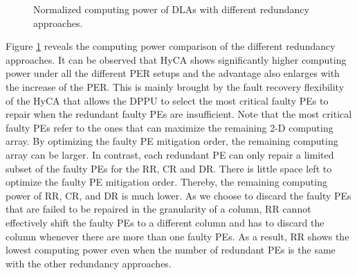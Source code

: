 \begin{figure}
\setlength{\abovecaptionskip}{-10pt}
\setlength{\belowcaptionskip}{-2pt}
    \caption{Normalized computing power of DLAs with different redundancy approaches.}
\label{fig:available}
\vspace{-1em}
\end{figure}

Figure \ref{fig:available} reveals the computing power comparison of the different redundancy approaches. It can be observed that HyCA shows significantly higher computing power under all the different PER setups and the advantage also enlarges with the increase of the PER. This is mainly brought by the fault recovery flexibility of the HyCA that allows the DPPU to select the most critical faulty PEs to repair when the redundant faulty PEs are insufficient. Note that the most critical faulty PEs refer to the ones that can maximize the remaining 2-D computing array. By optimizing the faulty PE mitigation order, the remaining computing array can be larger. In contrast, each redundant PE can only repair a limited subset of the faulty PEs for the RR, CR and DR. There is little space left to optimize the faulty PE mitigation order. Thereby, the remaining computing power of RR, CR, and DR is much lower. As we choose to discard the faulty PEs that are failed to be repaired in the granularity of a column, RR cannot effectively shift the faulty PEs to a different column and has to discard the column whenever there are more than one faulty PEs. As a result, RR shows the lowest computing power even when the number of redundant PEs is the same with the other redundancy approaches.


